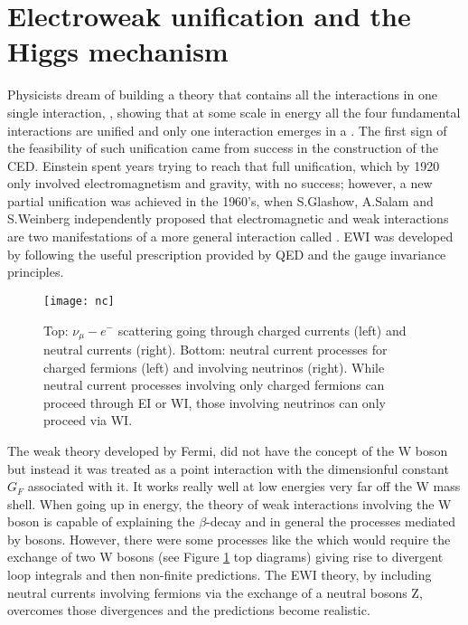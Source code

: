 \section{Electroweak unification and the Higgs mechanism}\label{sec:EWI}

Physicists dream of building a theory that contains all the interactions in one single interaction, \ie, showing that at some scale in energy all the four fundamental interactions are unified and only one interaction emerges in a . The first sign of the feasibility of such unification came from success in the construction of the CED. Einstein spent years trying to reach that full unification, which by 1920 only involved electromagnetism and gravity, with no success; however, a new partial unification was achieved in the 1960's, when S.Glashow\cite{glashow}, A.Salam\cite{salam} and S.Weinberg \cite{weinberg} independently proposed that electromagnetic and weak interactions are two manifestations of a more general interaction called . EWI was developed by following the useful prescription provided by QED and the gauge invariance principles.

\begin{figure}[h!]
  \centering
  \texttt{[image: nc]}
  \caption[Neutral current processes]{Top: $\nu_{\mu}-e^-$ scattering going through charged currents (left) and neutral currents (right). Bottom: neutral current processes for charged fermions (left) and involving neutrinos (right). While neutral current processes involving only charged fermions can proceed through EI or WI, those involving neutrinos can only proceed via WI.}%
         \label{nc}
\end{figure}

The  weak theory developed by Fermi, did not have the concept of the W boson but instead it was treated as a point interaction with the dimensionful constant $G_F$ associated with it. It works really well at low energies very far off the W mass shell. When going up in energy, the theory of weak interactions involving the W boson is capable of explaining the $\beta$-decay and in general the processes mediated by \wpm bosons. However, there were some processes like the  which would require the exchange of two W bosons (see Figure \ref{nc} top diagrams) giving rise to divergent loop integrals and then non-finite predictions. The EWI theory, by including neutral currents involving fermions via the exchange of a neutral bosons Z, overcomes those divergences and the predictions become realistic.

